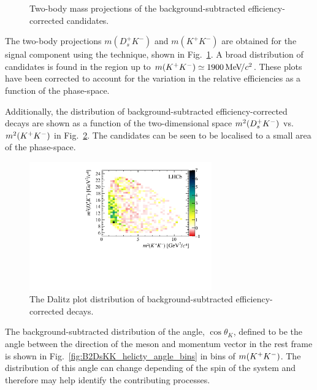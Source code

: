 \begin{figure}[!h]
\begin{subfigure}[t]{0.49\textwidth}
    \end{subfigure}
    \caption{Two-body mass projections of the background-subtracted efficiency-corrected \decay{\Bp}{\Dsp\Kp\Km} candidates.}
    \label{fig:B2DsKK_twobodyprojections}
\end{figure}

The two-body projections $m(D_{s}^{+}K^{-})$ and $m(K^{+}K^{-})$ are obtained for the signal component using the \sPlot technique, shown in Fig.~\ref{fig:B2DsKK_twobodyprojections}. A broad distribution of candidates is found in the region up to $m({{K}^+}{{K}^-}) \simeq 1900 {\mathrm{\,Me\kern -0.1em V\!/}c^2}$. These plots have been corrected to account for the variation in the relative efficiencies as a function of the phase-space.



Additionally, the distribution of background-subtracted efficiency-corrected \decay{\Bp}{\Dsp\Kp\Km} decays are shown as a function of the two-dimensional space $m^{2}({{D}^+_{s}}{{K}^-})$ vs. $m^{2}({{K}^+}{{K}^-})$ in Fig.~\ref{fig:B2DsKK_Dalitzplot}. The candidates can be seen to be localised to a small area of the phase-space. 

\begin{figure}[!h]
    \centering
    \includegraphics[width=0.7\textwidth]{figs/B2DsKK/Dalitz_plot_sweighted.pdf}
    \caption{The Dalitz plot distribution of background-subtracted efficiency-corrected \decay{\Bp}{\Dsp\Kp\Km} decays.}
    \label{fig:B2DsKK_Dalitzplot}   
\end{figure}



The background-subtracted distribution of the angle, $\cos{\theta_{K}}$, defined to be the angle between the direction of the \Kp meson and \Bp momentum vector in the \Kp\Km rest frame is shown in Fig.~\ref{fig:B2DsKK_helicty_angle_bins} in bins of $m({{K}^+}{{K}^-})$. The distribution of this angle can change depending of the spin of the \Kp\Km system and therefore may help identify the contributing processes. 

